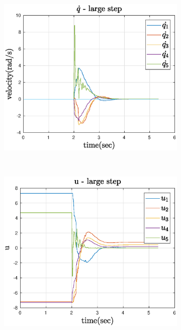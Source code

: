 \begin{figure}[htbp]
    ~
    \centering
    \begin{subfigure}[htbp]{0.45\textwidth}
        \centering
        \includegraphics[width = \picsSiz\linewidth]{img/LSqdot.eps}
        \caption{ }
    \end{subfigure}
    ~ 
    \begin{subfigure}[htbp]{0.45\textwidth}
        \centering
        \includegraphics[width = \picsSiz\linewidth]{img/LSu.eps}
        \caption{ }
    \end{subfigure}

\end{figure}
